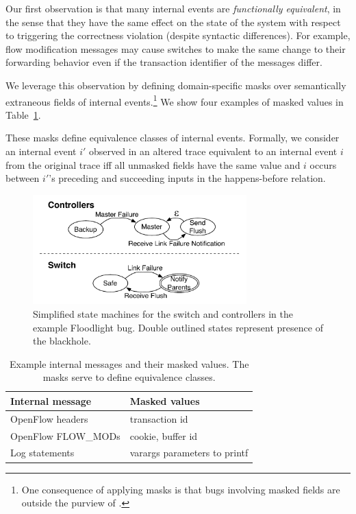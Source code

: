 Our first observation is that many internal events are {\em functionally
equivalent}, in the sense that they
have the same effect on the state of the system with respect to triggering the
correctness violation (despite syntactic differences). For example, flow
modification messages may cause switches to make the same change to their forwarding behavior
even if the transaction identifier of the messages differ.

We leverage this observation by defining
domain-specific masks over semantically extraneous fields of
internal events.\footnote{One consequence
of applying masks is that bugs involving masked fields are outside the purview of
\simulator.} We show four examples of masked values
in Table~\ref{tab:fingerprints}.

These masks define equivalence classes
of internal events. Formally, we consider an internal event $i'$ observed in an altered trace
equivalent to an internal event $i$ from the original trace iff all unmasked
fields have the same value
and $i$ occurs between $i'$'s preceding and succeeding inputs in the
happens-before relation.

\begin{figure}[t]
    \includegraphics[width=3.25in]{../diagrams/state_machines/controller_switch.pdf}
    \caption[]{\label{fig:state_machines} Simplified state machines for the switch and
    controllers in the example Floodlight bug. Double outlined states
    represent presence of the blackhole.}
\end{figure}

\begin{table}
\centering
\begin{tabular}{|l|l|}
\hline
Internal message & Masked values \\
\hline
OpenFlow headers & transaction id\\
OpenFlow FLOW\_MODs & cookie, buffer id \\
Log statements & varargs parameters to printf \\
\hline
\end{tabular}
\caption{Example internal messages and their masked values. The masks serve to
define equivalence classes.}
\label{tab:fingerprints}
\end{table}

